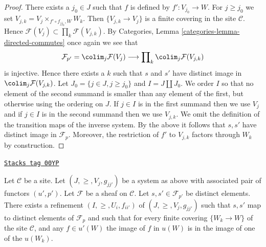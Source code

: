 \begin{proof}
There exists a $j_0 \in J$ such that $f$ is defined by $f' : V_{j_0} \to W$.
For $j \geq j_0$ we set $V_{j, k} = V_j \times_{f'\circ f_{j j_0}, W} W_k$.
Then $\{V_{j, k} \to V_j\}$ is a finite covering in the site
$\mathcal{C}$. Hence
$\mathcal{F}(V_j) \subset \prod_k \mathcal{F}(V_{j, k})$.
By Categories, Lemma \ref{categories-lemma-directed-commutes}
once again we see that
$$
\mathcal{F}_{p'} =
\colim_j \mathcal{F}(V_j)
\longrightarrow
\prod\nolimits_k \colim_j \mathcal{F}(V_{j, k})
$$
is injective. Hence there exists a $k$ such that $s$ and $s'$
have distinct image in $\colim_j \mathcal{F}(V_{j, k})$.
Let $J_0 = \{j \in J, j \geq j_0\}$ and $I = J \amalg J_0$.
We order $I$ so that no element of the second summand
is smaller than any element of the first, but otherwise
using the ordering on $J$. If $j \in I$ is in the first
summand then we use $V_j$ and if $j \in I$ is in the second
summand then we use $V_{j, k}$. We omit the definition
of the transition maps of the inverse system. By the above
it follows that $s, s'$ have distinct image in $\mathcal{F}_p$.
Moreover, the restriction of $f'$ to $V_{j, k}$ factors
through $W_k$ by construction.
\end{proof}

\begin{lemma}
\label{sites-lemma-refine-all-at-once}
\href{https://stacks.math.columbia.edu/tag/00YP}{\texttt{Stacks tag 00YP}}

Let $\mathcal{C}$ be a site.
Let $(J, \geq, V_j, g_{jj'})$ be a system as above with associated
pair of functors $(u', p')$.
Let $\mathcal{F}$ be a sheaf on $\mathcal{C}$.
Let $s, s' \in \mathcal{F}_{p'}$ be distinct elements.
There exists a refinement $(I, \geq, U_i, f_{ii'})$
of $(J, \geq, V_j, g_{jj'})$ such that $s, s'$ map
to distinct elements of $\mathcal{F}_p$ and such that
for every finite covering $\{W_k \to W\}$ of the site
$\mathcal{C}$, and any $f \in u'(W)$ the image of $f$ in $u(W)$
is in the image of one of the $u(W_k)$.
\end{lemma}

